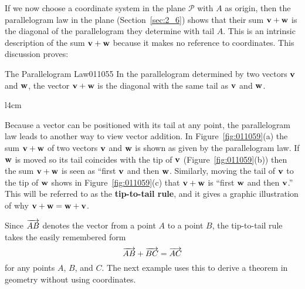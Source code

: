 If we now choose a coordinate system in the plane $\mathcal{P}$ with $A$ as origin, then the parallelogram law in the plane (Section~\ref{sec:2_6}) shows that their sum $\textbf{v} + \textbf{w}$ is the diagonal of the parallelogram they determine with tail $A$. This is an intrinsic description of the sum $\textbf{v} + \textbf{w}$ because it makes no reference to coordinates. This discussion proves:

\begin{theorem*}{The Parallelogram Law}{011055}
In the parallelogram determined by two vectors $\textbf{v}$ and $\textbf{w}$, the vector $\textbf{v} + \textbf{w}$ is the diagonal with the same tail as $\textbf{v}$ and $\textbf{w}$.
\end{theorem*}

\begin{wrapfigure}[14]{l}{4cm} 
	\centering
	
	\caption{\label{fig:011059}}
\end{wrapfigure}

Because
 a vector can be positioned with its tail at any point, the 
parallelogram law leads to another way to view vector addition. In Figure~\ref{fig:011059}(a) the sum $\textbf{v} + \textbf{w}$ of two vectors $\textbf{v}$ and $\textbf{w}$ is shown as given by the parallelogram law. If $\textbf{w}$ is moved so its tail coincides with the tip of $\textbf{v}$ (Figure~\ref{fig:011059}(b)) then the sum $\textbf{v} + \textbf{w}$ is seen as ``first $\textbf{v}$ and then $\textbf{w}$. Similarly, moving the tail of $\textbf{v}$ to the tip of $\textbf{w}$ shows in Figure~\ref{fig:011059}(c) that $\textbf{v} + \textbf{w}$ is ``first $\textbf{w}$ and then $\textbf{v}$.'' This will be referred to as the \textbf{tip-to-tail rule}, and it gives a graphic illustration of why $\textbf{v} + \textbf{w} = \textbf{w} + \textbf{v}$.

Since $\overrightarrow{AB}$ denotes the vector from a point $A$ to a point $B$, the tip-to-tail rule takes the easily remembered form
\begin{equation*}
\overrightarrow{AB} + \overrightarrow{BC} = \overrightarrow{AC}
\end{equation*}
for any points $A$, $B$, and $C$. The next example uses this to derive a theorem in geometry without using coordinates.


